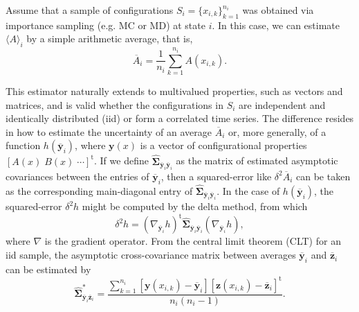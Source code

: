 \documentclass[aip,jcp,reprint,amsmath,amssymb]{revtex4-1}
\newcommand{\mt}[1]{\boldsymbol{\mathbf{#1}}}           %
\newcommand{\vt}[1]{\boldsymbol{\mathbf{#1}}}           %
\newcommand{\tr}[1]{#1^\text{t}}                        %
\begin{document}
Assume that a sample of configurations $S_i = \{x_{i,k}\}_{k=1}^{n_i}$ was obtained via importance sampling\cite{Allen_1987} (e.g. MC or MD) at state $i$. In this case, we can estimate $\langle A \rangle_i$ by a simple arithmetic average, that is,
\begin{equation}
\label{eq:average estimator}
\overline A_i = \frac{1}{n_i} \sum_{k=1}^{n_i} A(x_{i,k}).
\end{equation}

This estimator naturally extends to multivalued properties, such as vectors and matrices, and is valid whether the configurations in $S_i$ are independent and identically distributed (iid) or form a correlated time series. The difference resides in how to estimate the uncertainty of an average $\overline A_i$ or, more generally, of a function $h(\overline {\vt y}_i)$, where $\vt y(x)$ is a vector of configurational properties $\tr{[A(x) \; B(x) \; \cdots]}$. If we define $\hat{\mt \Sigma}_{\overline{\vt y}_i\overline{\vt y}_i}$ as the matrix of estimated asymptotic covariances between the entries of $\overline{\vt y}_i$, then a squared-error like $\delta^2 \overline A_i$ can be taken as the corresponding main-diagonal entry of $\hat{\mt \Sigma}_{\overline{\vt y}_i\overline{\vt y}_i}$. In the case of $h(\overline{\vt y}_i)$, the squared-error $\delta^2 h$ might be computed by the delta method,\cite{Greene_2012} from which
\begin{equation}
\label{eq:delta method}
\delta^2 h = \tr{(\nabla_{\overline{\vt y}_i} h)} \hat{\mt \Sigma}_{\overline{\vt y}_i\overline{\vt y}_i}(\nabla_{\overline{\vt y}_i} h),
\end{equation} 
where $\nabla$ is the gradient operator. From the central limit theorem (CLT) for an iid sample, the asymptotic cross-covariance matrix between averages $\overline{\vt y}_i$ and $\overline{\vt z}_i$ can be estimated by
\begin{equation*}
\label{eq:asymptotic covariance IID}
\hat{\mt \Sigma}^\ast_{\overline{\vt y}_i\overline{\vt z}_i} = \frac{\sum\limits_{k=1}^{n_i} \left[\vt y(x_{i,k}) - \overline{\vt y}_i\right] \tr{\left[\vt z(x_{i,k}) - \overline{\vt z}_i\right]}}{n_i(n_i - 1)}.
\end{equation*}
\end{document}
